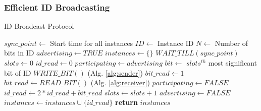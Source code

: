 
%

\subsubsection{Efficient ID Broadcasting}
\label{sec:method:protocol}


\begin{algorithm}[!t]
\caption{ID Broadcast Protocol}
\label{alg:protcol}
\begin{algorithmic}[1]
\STATE $sync\_point \leftarrow$ {Start time for all instances}
\STATE $ID \leftarrow$ {Instance ID}
\STATE $N \leftarrow$ {Number of bits in ID}
\STATE $advertising \leftarrow TRUE$
\STATE $instances \leftarrow \{\} $
\STATE $WAIT\_TILL(sync\_point)$
    \STATE $slots \leftarrow 0$
    \STATE $id\_read \leftarrow 0$
    \STATE $participating \leftarrow advertising$
        \STATE $bit \leftarrow$ {$slots^{th}$ most significant bit of ID}
            \STATE $WRITE\_BIT()$               (Alg. \ref{alg:sender})
            \STATE $bit\_read \leftarrow 1$
        \ELSE
            \STATE $bit\_read \leftarrow READ\_BIT()$       (Alg. \ref{alg:receiver})
                \STATE $participating \leftarrow FALSE$
            \ENDIF
        \ENDIF
        \STATE $id\_read \leftarrow 2 * id\_read + bit\_read$
        \STATE $slots \leftarrow slots + 1$
    \ENDWHILE
        \STATE $advertising \leftarrow FALSE$
    \ENDIF
    \STATE $instances \leftarrow instances \cup \{id\_read\}$
\ENDWHILE
\STATE \textbf{return} $instances$
\end{algorithmic}
\end{algorithm}


